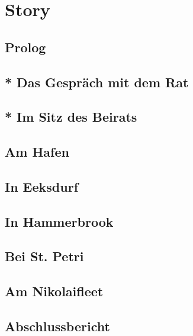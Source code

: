 
\chapter{Story}

\section{\textbf{Prolog}}


\section{\textbf{* Das Gespräch mit dem Rat}}


\section{\textbf{* Im Sitz des Beirats}}


\section{\textbf{Am Hafen}}
\label{Hafen}

\newpage

\section{\textbf{In Eeksdurf}}
\label{xd}

\newpage

\section{\textbf{In Hammerbrook}}
\label{arm}

\newpage

\section{\textbf{Bei St. Petri}}
\label{Petri}

\newpage

\section{\textbf{Am Nikolaifleet}}
\label{Fleet}


\section{\textbf{Abschlussbericht}}
\label{Fertig}

